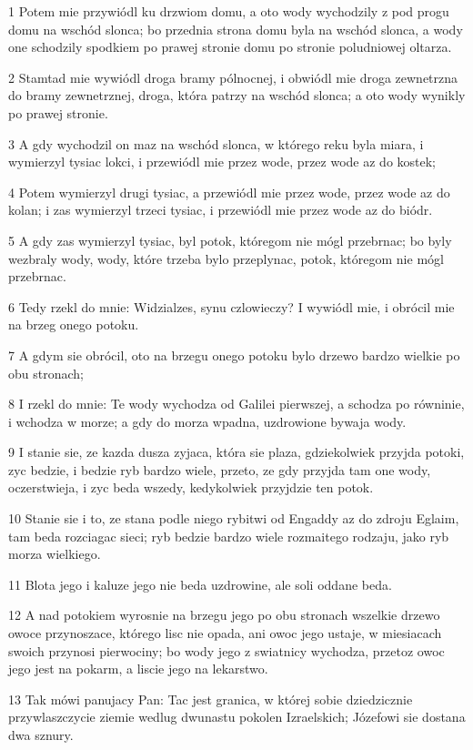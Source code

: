 \par 1 Potem mie przywiódl ku drzwiom domu, a oto wody wychodzily z pod progu domu na wschód slonca; bo przednia strona domu byla na wschód slonca, a wody one schodzily spodkiem po prawej stronie domu po stronie poludniowej oltarza.
\par 2 Stamtad mie wywiódl droga bramy pólnocnej, i obwiódl mie droga zewnetrzna do bramy zewnetrznej, droga, która patrzy na wschód slonca; a oto wody wynikly po prawej stronie.
\par 3 A gdy wychodzil on maz na wschód slonca, w którego reku byla miara, i wymierzyl tysiac lokci, i przewiódl mie przez wode, przez wode az do kostek;
\par 4 Potem wymierzyl drugi tysiac, a przewiódl mie przez wode, przez wode az do kolan; i zas wymierzyl trzeci tysiac, i przewiódl mie przez wode az do biódr.
\par 5 A gdy zas wymierzyl tysiac, byl potok, któregom nie mógl przebrnac; bo byly wezbraly wody, wody, które trzeba bylo przeplynac, potok, któregom nie mógl przebrnac.
\par 6 Tedy rzekl do mnie: Widzialzes, synu czlowieczy? I wywiódl mie, i obrócil mie na brzeg onego potoku.
\par 7 A gdym sie obrócil, oto na brzegu onego potoku bylo drzewo bardzo wielkie po obu stronach;
\par 8 I rzekl do mnie: Te wody wychodza od Galilei pierwszej, a schodza po równinie, i wchodza w morze; a gdy do morza wpadna, uzdrowione bywaja wody.
\par 9 I stanie sie, ze kazda dusza zyjaca, która sie plaza, gdziekolwiek przyjda potoki, zyc bedzie, i bedzie ryb bardzo wiele, przeto, ze gdy przyjda tam one wody, oczerstwieja, i zyc beda wszedy, kedykolwiek przyjdzie ten potok.
\par 10 Stanie sie i to, ze stana podle niego rybitwi od Engaddy az do zdroju Eglaim, tam beda rozciagac sieci; ryb bedzie bardzo wiele rozmaitego rodzaju, jako ryb morza wielkiego.
\par 11 Blota jego i kaluze jego nie beda uzdrowine, ale soli oddane beda.
\par 12 A nad potokiem wyrosnie na brzegu jego po obu stronach wszelkie drzewo owoce przynoszace, którego lisc nie opada, ani owoc jego ustaje, w miesiacach swoich przynosi pierwociny; bo wody jego z swiatnicy wychodza, przetoz owoc jego jest na pokarm, a liscie jego na lekarstwo.
\par 13 Tak mówi panujacy Pan: Tac jest granica, w której sobie dziedzicznie przywlaszczycie ziemie wedlug dwunastu pokolen Izraelskich; Józefowi sie dostana dwa sznury.
